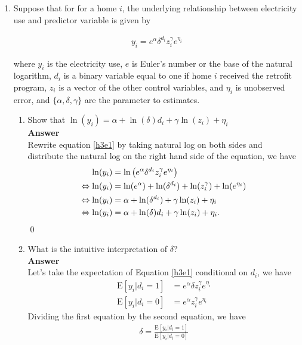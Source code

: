 \documentclass{article}
\newcommand{\E}{\text{E}}
\begin{document}
\begin{enumerate}
\item Suppose that for for a home $i$, the underlying relationship between electricity use and predictor variable is given by 

\begin{align}
    y_i=e^\alpha\delta^{d_i}z_i^{\gamma}e^{\eta_i} \label{h3e1}
\end{align}

where $y_i$ is the electricity use, $e$ is Euler's number or the base of the natural logarithm, $d_i$ is a binary variable equal to one if home $i$ received the retrofit program, $z_i$ is a vector of the other control variables, and $\eta_i$ is unobserved error, and $\{\alpha,\delta,\gamma\}$ are the parameter to estimates.

\begin{enumerate}
    \item Show that $\ln(y_i)=\alpha+\ln(\delta)d_i+\gamma\ln(z_i)+\eta_i$
    \\\textbf{Answer}\\
    Rewrite equation \eqref{h3e1} by taking natural log on both sides and distribute the natural log on the right hand side of the equation, we have
    \begin{align}
         \ln(y_i)&=\ln\left(e^\alpha\delta^{d_i}z_i^{\gamma}e^{\eta_i}\right) \notag\\
        \Leftrightarrow\ln(y_i)&=\ln(e^\alpha)+\ln(\delta^{d_i})+\ln(z_i^{\gamma})+\ln(e^{\eta_i}) \notag\\
        \Leftrightarrow\ln(y_i)&=\alpha+\ln(\delta^{d_i})+\gamma\ln(z_i)+\eta_i \notag\\
        \Leftrightarrow\ln(y_i)&=\alpha+\ln(\delta)d_i+\gamma\ln(z_i)+\eta_i\label{h3e2}.
    \end{align}\qed
    \item What is the intuitive interpretation of $\delta$?
    \\\textbf{Answer}\\
    Let's take the expectation of Equation \eqref{h3e1} conditional on $d_i$, we have
    \begin{align}
        \E[y_i|d_i=1]&=e^\alpha\delta z_i^{\gamma}e^{\eta_i}\\
        \E[y_i|d_i=0]&=e^\alpha z_i^{\gamma}e^{\eta_i}
    \end{align}
    Dividing the first equation by the second equation, we have
    \begin{align}
        \delta=\frac{\E[y_i|d_i=1]}{\E[y_i|d_i=0]} \label{h3e5} 

\end{align}
\end{enumerate}
\end{enumerate}
\end{document}
